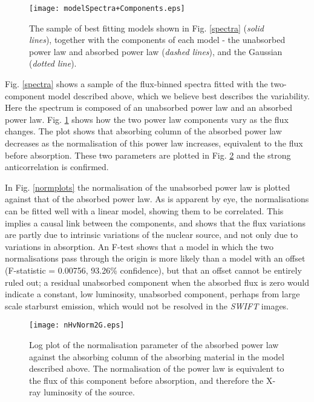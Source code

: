 \documentclass[useAMS,usenatbib]{sam}
\begin{document}
 \begin{figure}
	\texttt{[image: modelSpectra+Components.eps]}
	\caption{The sample of best fitting models shown in Fig. \ref{spectra} ({\it solid lines}), together with the components of each model - the unabsorbed power
	law and absorbed power law ({\it dashed lines}), and the Gaussian ({\it dotted line}).}
	\label{modelSpectra}
\end{figure} 
 

Fig. \ref{spectra} shows a sample of the flux-binned spectra fitted with the two-component model described above, which we believe best describes the variability.  Here
the spectrum is composed of an unabsorbed power law and an absorbed power law. Fig. \ref{modelSpectra} shows how the two power law components vary as the flux changes.
The plot shows that absorbing column of the absorbed power law decreases as the normalisation of this power law increases, equivalent to the flux before absorption. These
two parameters are plotted in Fig. \ref{nhplots} and the strong anticorrelation is confirmed. 

In Fig. \ref{normplots} the normalisation of the unabsorbed power law is plotted against that of the absorbed power law. As is apparent by eye, the normalisations can be
fitted well with a linear model, showing them to be correlated. This implies a causal link between the components, and shows that the flux variations
are partly due to intrinsic variations of the nuclear source, and not only due to variations in absorption. An F-test shows that a model in which the two
normalisations pass through the origin is more likely than a model with an offset (F-statistic = 0.00756, 93.26\% confidence), but that an offset cannot be entirely ruled
out; a residual unabsorbed component when the absorbed flux is zero would indicate a constant, low luminosity, unabsorbed component, perhaps from large scale starburst
emission, which would not be resolved in the {\it SWIFT} images.



\begin{figure}
	
	\texttt{[image: nHvNorm2G.eps]}\hspace{1pt}
	\caption{Log plot of the normalisation parameter of the absorbed power law 
		against the absorbing column of the absorbing material in
		the model described above. The normalisation of the power law is equivalent to the flux
		of this component before absorption, and therefore the X-ray luminosity of the source.}
	
	\label{nhplots}
\end{figure}  
		
\end{document}
